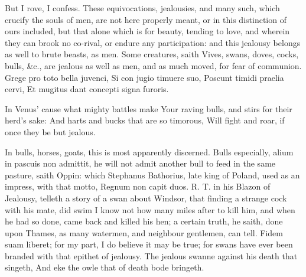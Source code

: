 {But I rove, I confess. These equivocations, jealousies, and many such,
which crucify the souls of men, are not here properly meant, or in this
distinction of ours included, but that alone which is for beauty,
tending to love, and wherein they can brook no co-rival, or endure any
participation: and this jealousy belongs as well to brute beasts, as
men. Some creatures, saith Vives, swans, doves, cocks, bulls,
\&c., are jealous as well as men, and as much moved, for fear of
communion.
Grege pro toto bella juvenci,
Si con jugio timuere suo,
Poscunt timidi praelia cervi,
Et mugitus dant concepti signa furoris.

In Venus' cause what mighty battles make
Your raving bulls, and stirs for their herd's sake:
And harts and bucks that are so timorous,
Will fight and roar, if once they be but jealous.

In bulls, horses, goats, this is most apparently discerned. Bulls
especially, alium in pascuis non admittit, he will not admit another
bull to feed in the same pasture, saith Oppin: which Stephanus
Bathorius, late king of Poland, used as an impress, with that motto,
Regnum non capit duos. R. T. in his Blazon of Jealousy, telleth a story
of a swan about Windsor, that finding a strange cock with his mate, did
swim I know not how many miles after to kill him, and when he had so
done, came back and killed his hen; a certain truth, he saith, done
upon Thames, as many watermen, and neighbour gentlemen, can tell. Fidem
suam liberet; for my part, I do believe it may be true; for swans have
ever been branded with that epithet of jealousy.
The jealous swanne against his death that singeth,
And eke the owle that of death bode bringeth.

}
